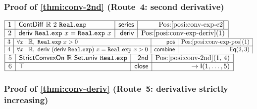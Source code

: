 \documentclass[11pt,reqno]{amsart}
\theoremstyle{redplain}
\numberwithin{equation}{section}
\begin{document}
\subsubsection*{Proof of \autoref{thmi:conv-2nd} (Route~4: second derivative)%
}

\begin{center}
$%
\begin{array}{|c|l|r|r|}
\hline
1 & \mathsf{ContDiff}\ \mathbb{R}\ 2\ \mathtt{Real.exp} & \mathsf{series} & %
\mbox{Pos:\ref{posi:conv-exp-c2}} \\ \hline
2 & \mathsf{deriv}\ \mathtt{Real.exp}\ x=\mathtt{Real.exp}\ x & \mathsf{deriv%
} & \mbox{Pos:\ref{posi:conv-exp-deriv}(1)}%
\end{array}%
$ \noindent $%
\begin{array}{|c|l|r|r|}
\hline
3 & \forall x:\mathbb{R},\ \mathtt{Real.exp}\ x>0 & \mathsf{pos} & %
\mbox{Pos:\ref{posi:conv-exp-pos}(1)} \\ \hline
4 & \forall x:\mathbb{R},\ \mathsf{deriv}\ (\mathsf{deriv}\ \mathtt{Real.exp}%
)\ x=\mathtt{Real.exp}\ x>0 & \mathsf{combine} & \mathsf{Eq}(2,3)%
\end{array}%
$ \noindent $%
\begin{array}{|c|l|r|r|}
\hline
5 & \mathsf{StrictConvexOn}\ \mathbb{R}\ \mathsf{Set.univ}\ \mathtt{Real.exp}
& \mathsf{2nd} & \mbox{Pos:\ref{posi:conv-2nd}(1, 4)} \\ \hline
6 & \top & \mathsf{close} & \rightarrow \mathsf{I}(1,\dots ,5) \\ \hline
\end{array}%
$
\end{center}

\subsubsection*{Proof of \autoref{thmi:conv-deriv} (Route~5: derivative
strictly increasing)}
\end{document}

